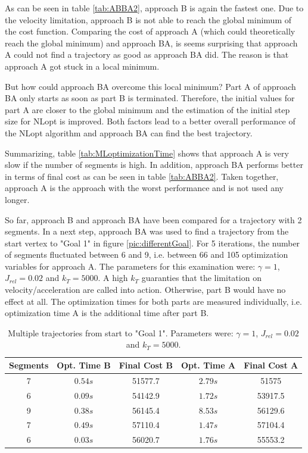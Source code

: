 As can be seen in table \ref{tab:ABBA2}, approach B is again the fastest one. Due to the velocity limitation, approach B is not able to reach the global minimum of the cost function. Comparing the cost of approach A (which could theoretically reach the global minimum) and approach BA, is seems surprising that approach A could not find a trajectory as good as approach BA did. The reason is that approach A got stuck in a local minimum. \newline

But how could approach BA overcome this local minimum? Part A of approach BA only starts as soon as part B is terminated. Therefore, the initial values for part A are closer to the global minimum and the estimation of the initial step size for NLopt is improved. Both factors lead to a better overall performance of the NLopt algorithm and approach BA can find the best trajectory. \newline

Summarizing, table \ref{tab:MLoptimizationTime} shows that approach A is very slow if the number of segments is high. In addition, approach BA performs better in terms of final cost as can be seen in table \ref{tab:ABBA2}. Taken together, approach A is the approach with the worst performance and is not used any longer.\newline

So far, approach B and approach BA have been compared for a trajectory with 2 segments. In a next step, approach BA was used to find a trajectory from the start vertex to "Goal 1" in figure \ref{pic:differentGoal}. For 5 iterations, the number of segments fluctuated between 6 and 9, i.e. between 66 and 105 optimization variables for approach A. The parameters for this examination were: $\gamma = 1$, $J_{rel} = 0.02$ and $k_T = 5000$. A high $k_T$ guaranties that the limitation on velocity/acceleration are called into action. Otherwise, part B would have no effect at all. The optimization times for both parts are measured individually, i.e. optimization time A is the additional time after part B.

\begin{table}[H] 
\begin{center}
    \begin{tabular}{| c | c | c |  c | c |}
    \hline
   Segments  & Opt. Time B & Final Cost B & Opt. Time A & Final Cost A \\ \hline
 7& $0.54s$ & 51577.7 & $2.79s$ & 51575 \\ \hline
 6& $0.09s$ & 54142.9 & $1.72s$ & 53917.5 \\ \hline
 9& $0.38s$ &56145.4  & $8.53s$ & 56129.6 \\ \hline
 7& $0.49s$ & 57110.4 & $1.47s$ & 57104.4 \\ \hline
 6& $0.03s$ & 56020.7  & $1.76s$ & 55553.2\\
    \hline
    \end{tabular}
    \caption{Multiple trajectories from start to "Goal 1". Parameters were: $\gamma = 1$, $J_{rel} = 0.02$ and $k_T = 5000$.}
    \label{tab:BA_compare}
\end{center}
\end{table}

